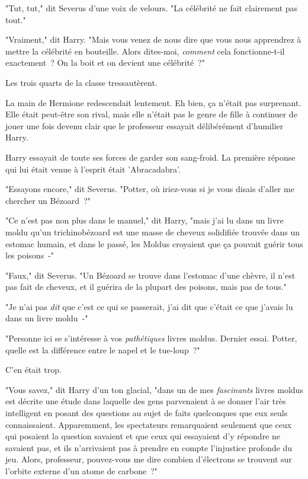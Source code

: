 "Tut, tut," dit Severus d'une voix de velours. "La célébrité ne fait clairement pas tout."

"Vraiment," dit Harry. "Mais vous venez de nous dire que vous nous apprendrez à mettre la célébrité en bouteille. Alors dites-moi, \emph{comment} cela fonctionne-t-il exactement~? On la boit et on devient une célébrité~?"

Les trois quarts de la classe tressautèrent.

La main de Hermione redescendait lentement. Eh bien, ça n'était pas surprenant. Elle était peut-être son rival, mais elle n'était pas le genre de fille à continuer de jouer une fois devenu clair que le professeur essayait délibérément d'humilier Harry.

Harry essayait de toute ses forces de garder son sang-froid. La première réponse qui lui était venue à l'esprit était 'Abracadabra'.

"Essayons encore," dit Severus. "Potter, où iriez-vous si je vous disais d'aller me chercher un Bézoard~?"

"Ce n'est pas non plus dans le manuel," dit Harry, "mais j'ai lu dans un livre moldu qu'un trichinobézoard est une masse de cheveux solidifiée trouvée dans un estomac humain, et dans le passé, les Moldus croyaient que ça pouvait guérir tous les poisons~-"

"Faux," dit Severus. "Un Bézoard se trouve dans l'estomac d'une chèvre, il n'est pas fait de cheveux, et il guérira de la plupart des poisons, mais pas de tous."

"Je n'ai pas \emph{dit} que c'est ce qui se passerait, j'ai dit que c'était ce que j'avais lu dans un livre moldu~-"

"Personne ici se s'intéresse à vos \emph{pathétiques} livres moldus. Dernier essai. Potter, quelle est la différence entre le napel et le tue-loup~?"

C'en était trop.

"Vous savez," dit Harry d'un ton glacial, "dans un de mes \emph{fascinants} livres moldus est décrite une étude dans laquelle des gens parvenaient à se donner l'air très intelligent en posant des questions au sujet de faits quelconques que eux seuls connaissaient. Apparemment, les spectateurs remarquaient seulement que ceux qui posaient la question savaient et que ceux qui essayaient d'y répondre ne savaient pas, et ils n'arrivaient pas à prendre en compte l'injustice profonde du jeu. Alors, professeur, pouvez-vous me dire combien d'électrons se trouvent sur l'orbite externe d'un atome de carbone~?"

